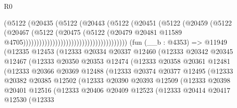 \begin{lexlean}{R0}
\begin{coremodule}
                                                      (@5122
                                                        (@20435
                                                          (@5122
                                                            (@20443
                                                              (@5122
                                                                (@20451
                                                                  (@5122
                                                                    (@20459
                                                                      (@5122
                                                                        (@20467
                                                                          (@5122
                                                                            (@20475
                                                                              (@5122
                                                                                (@20479
                                                                                  @20481
                                                                                  @11589
                                                                                  @4705)))))))))))))))))))))))))))))))))))))))
    (fun (__b : @4353) =>
    @11949
      (@12335
        @12453
        (@12333
          @20334
          @20337
          @12460
          (@12333
            @20342
            @20345
            @12467
            (@12333
              @20350
              @20353
              @12474
              (@12333
                @20358
                @20361
                @12481
                (@12333
                  @20366
                  @20369
                  @12488
                  (@12333
                    @20374
                    @20377
                    @12495
                    (@12333
                      @20382
                      @20385
                      @12502
                      (@12333
                        @20390
                        @20393
                        @12509
                        (@12333
                          @20398
                          @20401
                          @12516
                          (@12333
                            @20406
                            @20409
                            @12523
                            (@12333
                              @20414
                              @20417
                              @12530
                              (@12333

\end{coremodule}
\end{lexlean}
